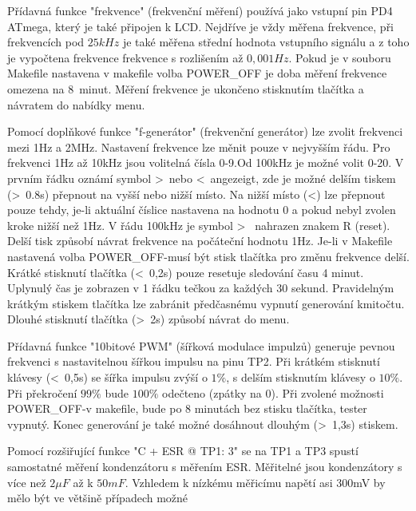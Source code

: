 \begin{description} \setlength{\itemsep}{0em}
 \item[Frekvence]
Přídavná funkce "frekvence" (frekvenční měření) používá jako vstupní pin PD4 ATmega,
který je také připojen k LCD.
Nejdříve je vždy měřena frekvence, při frekvencích pod \(25kHz\) je také měřena střední
hodnota vstupního signálu a z toho je vypočtena frekvence frekvence s rozlišením až \(0,001Hz\).
Pokud je v souboru Makefile nastavena v makefile volba POWER\_OFF  je doba měření frekvence omezena na  8~minut.
Měření frekvence je ukončeno stisknutím tlačítka a návratem do nabídky menu.
 \item[f-generátor]
Pomocí doplňkové funkce "f-generátor" (frekvenční generátor) lze zvolit frekvenci mezi 1Hz a 2MHz.
Nastavení frekvence lze měnit pouze v nejvyšším řádu.
Pro frekvenci 1Hz až 10kHz jsou volitelná čísla 0-9.Od 100kHz je možné volit 0-20.
V prvním řádku oznámí symbol \textgreater~nebo \textless~angezeigt, zde je možné delším tiskem
(\textgreater~0.8s) přepnout na vyšší nebo nižší místo.
Na nižší místo (\textless) lze přepnout pouze tehdy, je-li aktuální číslice nastavena na hodnotu 0
a pokud nebyl zvolen kroke nižší než 1Hz.
V řádu 100kHz je symbol \textgreater~  nahrazen znakem R (reset). Delší tisk způsobí
návrat frekvence na počáteční hodnotu 1Hz.
Je-li v Makefile nastavená volba POWER\_OFF-musí být stisk tlačítka pro změnu frekvence delší.
Krátké stisknutí tlačítka (\textless~0,2s) pouze resetuje sledování času 4 minut.
Uplynulý čas je zobrazen v 1 řádku tečkou za každých 30 sekund.
Pravidelným krátkým stiskem tlačítka lze zabránit předčasnému vypnutí generování kmitočtu.
Dlouhé stisknutí tlačítka (\textgreater~2s) způsobí návrat do menu.
 \item[10-bit PWM]
Přídavná funkce "10bitové PWM" (šířková modulace impulzů) generuje pevnou frekvenci s nastavitelnou
šířkou impulsu na pinu TP2.
Při krátkém stisknutí klávesy (\textless~0,5s) se šířka impulsu zvýší o \(1\%\), 
s delším stisknutím klávesy o \(10\%\).
Při překročení \(99\%\) bude \(100\%\) odečteno (zpátky na 0).
Při zvolené možnosti POWER\_OFF-v makefile, bude po 8 minutách bez stisku tlačítka, tester vypnutý.
Konec generování je také možné dosáhnout dlouhým (\textgreater~1,3s) stiskem.
 \item[C+ESR@TP1:3]
Pomocí rozšiřující funkce "C + ESR @ TP1: 3" se na TP1 a TP3 spustí samostatné měření kondenzátoru s měřením ESR.
Měřitelné jsou kondenzátory s více než \(2\mu F\) až k \(50mF\).
Vzhledem k nízkému měřicímu napětí asi 300mV by mělo být ve většině případech možné

\end{description}
